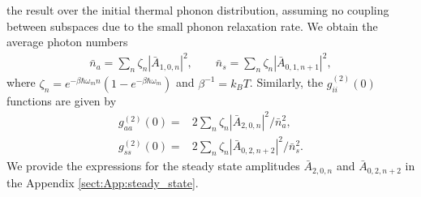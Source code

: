 the result over the initial thermal phonon distribution,
assuming no coupling between subspaces due to
the small phonon relaxation rate.
We obtain the
average photon numbers
\begin{align}
	\bar n_a=\sum_n \zeta_n |\bar A_{1,0,n}|^2,
	\qquad
	\bar n_s=\sum_n \zeta_n |\bar A_{0,1,n+1}|^2,
\end{align}
where $\zeta_n=e^{-\beta \hbar\omega_m n}(1-e^{-\beta \hbar\omega_m })$ and
$\beta^{-1}=k_B T$.
Similarly, the $g^{(2)}_{ii}(0)$ functions are given by 
\begin{align}
	g^{(2)}_{aa}(0)=&2\sum_n\zeta_n |\bar A_{2,0,n}|^2 / \bar n_a^2,\\
	g^{(2)}_{ss}(0)=&2\sum_n\zeta_n |\bar A_{0,2,n+2}|^2 / \bar n_s^2.
\end{align} 
We provide the expressions for the steady state amplitudes
$\bar A_{2,0,n}$ and $\bar A_{0,2,n+2}$ in the
 Appendix \ref{sect:App:steady_state}.

 





